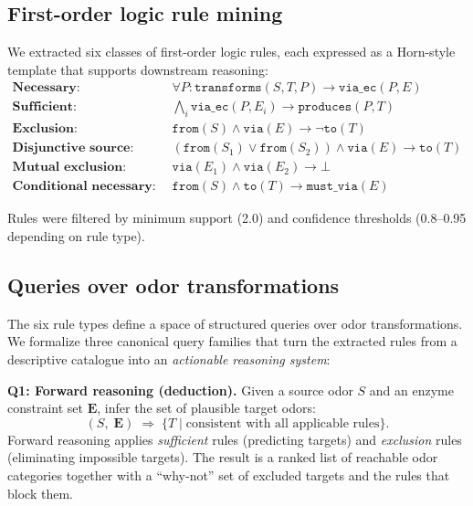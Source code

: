\documentclass[a4paper,fleqn]{cas-sc}
\begin{document}
\subsection{First-order logic rule mining}

We extracted six classes of first-order logic rules, each expressed as a Horn-style template that supports downstream reasoning:
\begin{align*}
\textbf{Necessary:}\quad & \forall P: \texttt{transforms}(S, T, P) \rightarrow \texttt{via\_ec}(P, E) \\
\textbf{Sufficient:}\quad & \bigwedge_i \texttt{via\_ec}(P, E_i) \rightarrow \texttt{produces}(P, T) \\
\textbf{Exclusion:}\quad & \texttt{from}(S) \wedge \texttt{via}(E) \rightarrow \neg\texttt{to}(T) \\
\textbf{Disjunctive source:}\quad & (\texttt{from}(S_1) \vee \texttt{from}(S_2)) \wedge \texttt{via}(E) \rightarrow \texttt{to}(T) \\
\textbf{Mutual exclusion:}\quad & \texttt{via}(E_1) \wedge \texttt{via}(E_2) \rightarrow \bot \\
\textbf{Conditional necessary:}\quad & \texttt{from}(S) \wedge \texttt{to}(T) \rightarrow \texttt{must\_via}(E)
\end{align*}

Rules were filtered by minimum support (2.0) and confidence thresholds (0.8--0.95 depending on rule type).

\subsection{Queries over odor transformations}\label{sec:queries}

The six rule types define a space of structured queries over odor transformations. We formalize three canonical query families that turn the extracted rules from a descriptive catalogue into an \emph{actionable reasoning system}:

\medskip
\noindent\textbf{Q1: Forward reasoning (deduction).}
Given a source odor $S$ and an enzyme constraint set $\mathbf{E}$, infer the set of plausible target odors:
\begin{equation}\label{eq:q1}
    (S, \;\mathbf{E}) \;\Rightarrow\; \{T \mid \text{consistent with all applicable rules}\}.
\end{equation}
Forward reasoning applies \emph{sufficient} rules (predicting targets) and \emph{exclusion} rules (eliminating impossible targets). The result is a ranked list of reachable odor categories together with a ``why-not'' set of excluded targets and the rules that block them.
\end{document}
